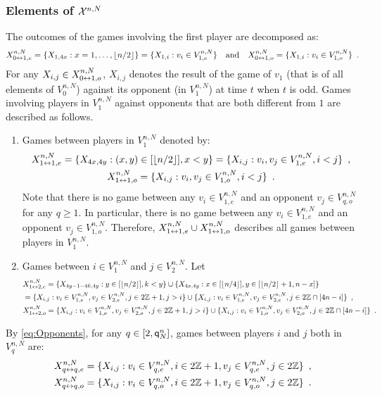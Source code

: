 \subsubsection{Elements of $\mathcal{X}^{n,N}$}
The outcomes of the games involving the first player are decomposed as:
\[
X_{0\leftrightarrow1,e}^{n,N}=\{X_{1,4x} : x=1,\ldots,\left\lfloor n/2\right\rfloor\}=\{X_{1,i} : v_i\in V_{1,e}^{n,N}\}\quad\mbox{and}\quad X_{0\leftrightarrow 1,o}^{n,N}=\{X_{1,i} : v_i\in V_{1,o}^{n,N}\}\enspace.
\]
For any $X_{i,j}\in X_{0\leftrightarrow 1,o}^{n,N}$, $X_{i,j}$ denotes the result of the game of $v_1$ (that is of all elements of $V_{0}^{n,N}$) against its opponent (in $V_{1}^{n,N}$) at time $t$ when $t$ is odd. Games involving players in $V_{1}^{n,N}$ against opponents that are both different from $1$ are described as follows.
\begin{enumerate}[-]
\item  Games between players in $V_{1}^{n,N}$ denoted by: 
\begin{gather*}
X_{1\leftrightarrow1,e}^{n,N}=\{X_{4x,4y} : (x,y)\in [\left\lfloor n/2\right\rfloor], x< y\}=\{X_{i,j} : v_i,v_j\in V_{1,e}^{n,N},i<j\}\enspace,\\
X_{1\leftrightarrow1,o}^{n,N}=\{X_{i,j} : v_i,v_j\in V_{1,o}^{n,N},i<j\}\enspace. 
\end{gather*}
Note that there is no game between any $v_i\in V_{1,e}^{n,N}$ and an opponent $v_j\in V_{q,o}^{n,N}$ for any $q\ge 1$. In particular, there is no game between any $v_i\in V_{1,e}^{n,N}$ and an opponent $v_j\in V_{1,o}^{n,N}$.  Therefore, $X_{1\leftrightarrow1,e}^{n,N}\cup X_{1\leftrightarrow1,o}^{n,N}$ describes all games between players in $V_{1}^{n,N}$. 
\item Games between $i\in V_{1}^{n,N}$ and $j\in V_{2}^{n,N}$. Let 
\begin{align*}
&X_{1\leftrightarrow2,e}^{n,N}=\{X_{4y-1-4k,4y} : y\in [\left\lfloor n/2\right\rfloor], k<y\}\cup\{X_{4x,4y} : x\in[\left\lfloor n/4\right\rfloor], y\in[\left\lfloor n/2\right\rfloor+1,n-x]\}\\
&=\{X_{i,j} : v_i\in V_{1,e}^{n,N},v_j\in V_{2,e}^{n,N},j\in 2\mathbb{Z}+1,j>i\}\cup\{X_{i,j} : v_i\in V_{1,e}^{n,N},v_j\in V_{2,e}^{n,N},j\in 2\mathbb{Z}\cap [4n-i]\}\enspace,\\
&X_{1\leftrightarrow2,o}^{n,N}=\{X_{i,j} : v_i\in V_{1,o}^{n,N},v_j\in V_{2,o}^{n,N},j\in 2\mathbb{Z}+1,j>i\}\cup\{X_{i,j} : v_i\in V_{1,o}^{n,N},v_j\in V_{2,o}^{n,N},j\in 2\mathbb{Z}\cap [4n-i]\}\enspace.
\end{align*}
\end{enumerate}
By \eqref{eq:Opponents}, for any $q\in [2,{\mathsf{q}}^{n}_{N}]$, games between players $i$ and $j$ both in $V_{q}^{n,N}$ are:
\begin{align}
 \notag X_{q \leftrightarrow q,e}^{n,N}&=\{X_{i,j} : v_i\in V_{q,e}^{n,N},i\in 2\mathbb{Z}+1, v_j\in V_{q,e}^{n,N},j\in 2\mathbb{Z}\}\enspace,\\
\label{Def:Vqtoq}  X_{q\leftrightarrow q,o}^{n,N}&=\{X_{i,j} : v_i\in V_{q,o}^{n,N},i\in 2\mathbb{Z}+1, v_j\in V_{q,o}^{n,N},j\in 2\mathbb{Z}\}\enspace.
\end{align}
